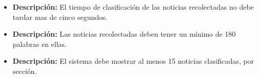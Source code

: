 


    \begin{itemize}
      \item \textbf{Descripción:} El tiempo de clasificación de las noticias recolectadas no debe tardar mas de cinco segundos.\\
    \end{itemize}

    \begin{itemize}
     \item \textbf{Descripción:} Las noticias recolectadas deben tener un mínimo de 180 palabras en ellas.\\
    \end{itemize}

    \begin{itemize}
      \item \textbf{Descripción:} El sistema debe mostrar al menos 15 noticias clasificadas, por sección.\\
    \end{itemize}

